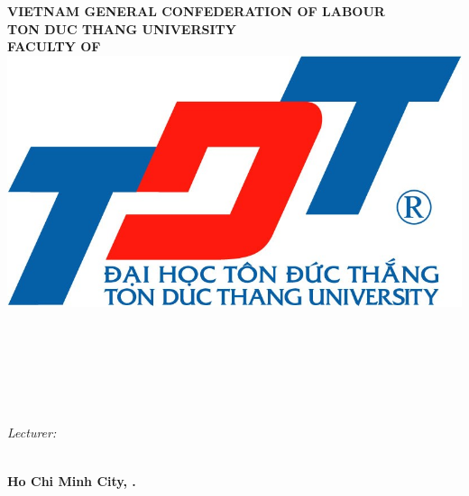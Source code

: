 \begin{center}
	\large{\textbf{VIETNAM GENERAL CONFEDERATION OF LABOUR}} \\
	\large{\textbf{TON DUC THANG UNIVERSITY}} \\
	\large{\textbf{\MakeUppercase{FACULTY OF \khoa}}} \\\vspace*{1cm}	
	\includegraphics[width=0.5\linewidth]{lib/TDTlogo.jpg}\\\vspace*{1cm}	
        \begin{center}
	    \large{\textbf{\tacgia}}\\
	    \large{\textbf{\svba}}\\
	    \large{\textbf{\svhai}}\\
    	\vspace*{2\baselineskip}
        \end{center}	
	\LARGE{\textbf{\MakeUppercase{\doan}}}\vspace*{1.2cm}
        
	\LARGE{\textbf{\MakeUppercase{\de}}}\\
	\Large{\textbf{\MakeUppercase{\monhoc}}}\vspace*{1.2cm}\\

        \large{\textit{Lecturer:}} \\
	   \large{\textbf{\gvhd}} 	\\ \vspace*{0.5cm}
        
	\large{\textbf{Ho Chi Minh City, \nam.}}
\end{center}